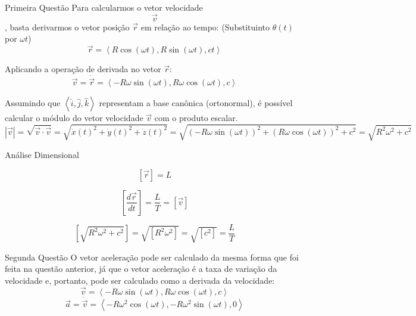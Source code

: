 Primeira Questão
Para calcularmos o vetor velocidade $$\vec{v}$$, basta derivarmos o vetor posição $\vec{r}$ em relação ao tempo: (Substituinto $\theta(t)$ por $\omega t$)
\begin{equation} \vec{r} = \left\langle R\cos\left(\omega t\right), R\sin\left(\omega t\right), ct \right\rangle \end{equation}

Aplicando a operação de derivada no vetor $\vec{r}$:
\begin{equation} \vec{v} = \dot{\vec{r}} = \left\langle -R \omega \sin\left(\omega t \right), R \omega \cos\left(\omega t \right), c \right\rangle \end{equation}

Assumindo que $\left\langle \hat{i}, \hat{j}, \hat{k} \right\rangle$ representam a base canônica (ortonormal), é possível calcular o módulo do vetor velocidade $\vec{v}$ com o produto escalar.
\begin{equation} |\vec{v}| = \sqrt{\vec{v} \cdot \vec{v}} = \sqrt{\dot{x}(t)^{2} + \dot{y}(t)^{2} + \dot{z}(t)^{2}} = \sqrt{\left( -R \omega \sin\left(\omega t\right) \right)^{2} + \left( R \omega \cos\left(\omega t\right) \right)^{2} + c^{2}} = \sqrt{R^{2} \omega^{2} + c^{2}} \end{equation}

Análise Dimensional


\begin{equation} \left[\vec{r}\right] = L \end{equation}

\begin{equation} \left[\frac{d \vec{r}}{dt}\right] = \frac{L}{T} = \left[\vec{v}\right] \end{equation} 

\begin{equation} \left[\sqrt{R^{2} \omega^{2} + c^{2}}\right] = \sqrt{ \left[R^{2} \omega^{2}\right]} = \sqrt{[c^{2}]} = \frac{L}{T} \end{equation}


Segunda Questão
O vetor aceleração pode ser calculado da mesma forma que foi feita na questão anterior, já que o vetor aceleração é a taxa de variação da velocidade e, portanto, pode ser calculado como a derivada da velocidade:
\begin{equation} \vec{v} = \left\langle -R \omega \sin\left(\omega t\right), R \omega \cos\left(\omega t \right), c \right\rangle \end{equation}
\begin{equation} \vec{a} = \dot{\vec{v}} = \left\langle -R \omega^{2} \cos\left(\omega t\right), -R \omega^{2} \sin\left(\omega t\right), 0 \right\rangle \end{equation}

